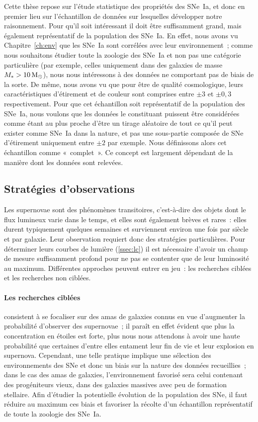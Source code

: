 \documentclass[../main/main.tex]{subfiles}
\begin{document}
Cette thèse repose sur l'étude statistique des propriétés des SNe~Ia, et donc en
premier lieu sur l'échantillon de données sur lesquelles développer notre
raisonnement. Pour qu'il soit intéressant il doit être suffisamment grand, mais
également représentatif de la population des SNe~Ia. En effet, nous avons vu
Chapitre~\ref{ch:env} que les SNe~Ia sont corrélées avec leur environnement~;
comme nous souhaitons étudier toute la zoologie des SNe~Ia et non pas une
catégorie particulière (par exemple, celles uniquement dans des galaxies de
masse $M_* > \SI{10}{\ensuremath{M_{\odot}}}$), nous nous intéressons à des données ne comportant
pas de biais de la sorte. De même, nous avons vu que pour être de qualité
cosmologique, leurs caractéristiques d'étirement et de couleur sont comprises
entre $\pm3$ et $\pm0,3$ respectivement. Pour que cet échantillon soit
représentatif de la population des SNe~Ia, nous voulons que les données le
constituant puissent être considérées comme étant au plus proche d'être un
tirage aléatoire de tout ce qu'il peut exister comme SNe~Ia dans la nature, et
pas une sous-partie composée de SNe d'étirement uniquement entre $\pm2$ par
exemple. Nous définissons alors cet échantillon comme «~complet~». Ce concept
est  largement dépendant de la manière dont les données sont relevées.

\subsection{Stratégies d'observations}\label{ssec:startobs}

Les supernovae sont des phénomènes transitoires, c'est-à-dire des objets dont le
flux lumineux varie dans le temps, et elles sont également brèves et rares~:
elles durent typiquement quelques semaines et surviennent environ une fois par
siècle et par galaxie. Leur observation requiert donc des stratégies
particulières. Pour déterminer leurs courbes de lumière (\ref{ssec:lc}) il est
nécessaire d'avoir un champ de mesure suffisamment profond pour ne pas se
contenter que de leur luminosité au maximum. Différentes approches peuvent
entrer en jeu~: les recherches ciblées et les recherches non ciblées.

\paragraph*{Les recherches ciblées} consistent à se focaliser sur des amas de
galaxies connus en vue d'augmenter la probabilité d'observer des supernovae~; il
paraît en effet évident que plus la concentration en étoiles est forte, plus
nous nous attendons à avoir une haute probabilité que certaines d'entre elles
entament leur fin de vie et leur explosion en supernova. Cependant, une telle
pratique implique une sélection des environnements des SNe et donc un biais sur
la nature des données recueillies~; dans le cas des amas de galaxies,
l'environnement favorisé sera celui contenant des progéniteurs vieux, dans des
galaxies massives avec peu de formation stellaire. Afin d'étudier la potentielle
évolution de la population des SNe, il faut réduire au maximum ces biais et
favoriser la récolte d'un échantillon représentatif de toute la zoologie des
SNe~Ia.
\end{document}
